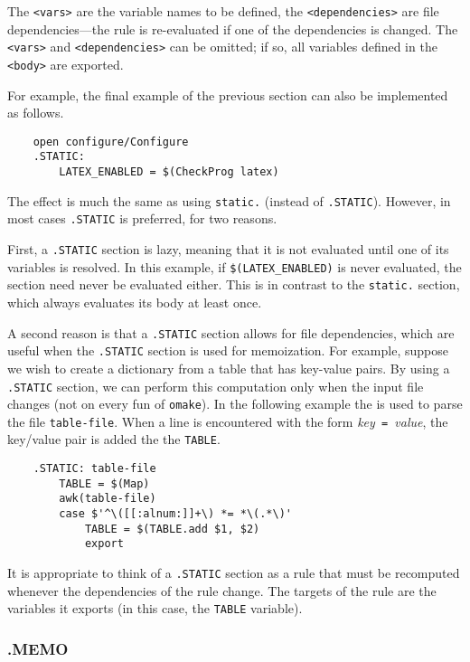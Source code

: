 The \verb+<vars>+ are the variable names to be defined, the \verb+<dependencies>+ are file
dependencies---the rule is re-evaluated if one of the dependencies is changed.  The \verb+<vars>+
and \verb+<dependencies>+ can be omitted; if so, all variables defined in the \verb+<body>+ are
exported.

For example, the final example of the previous section can also be implemented as follows.

\begin{verbatim}
    open configure/Configure
    .STATIC:
        LATEX_ENABLED = $(CheckProg latex)
\end{verbatim}
%
The effect is much the same as using \verb+static.+ (instead of \verb+.STATIC+).  However, in most
cases \verb+.STATIC+ is preferred, for two reasons.

First, a \verb+.STATIC+ section is lazy, meaning that it is not evaluated until one of its variables
is resolved.  In this example, if \verb+$(LATEX_ENABLED)+ is never evaluated, the section need never
be evaluated either.  This is in contrast to the \verb+static.+ section, which always evaluates its
body at least once.

A second reason is that a \verb+.STATIC+ section allows for file dependencies, which are useful when
the \verb+.STATIC+ section is used for memoization.  For example, suppose we wish to create a
dictionary from a table that has key-value pairs.  By using a \verb+.STATIC+ section, we can perform
this computation only when the input file changes (not on every fun of \verb+omake+).  In the
following example the  is used to parse the file \verb+table-file+.
When a line is encountered with the form \textit{key}\verb+ = +\textit{value}, the key/value pair is
added the the \verb+TABLE+.

\begin{verbatim}
    .STATIC: table-file
        TABLE = $(Map)
        awk(table-file)
        case $'^\([[:alnum:]]+\) *= *\(.*\)'
            TABLE = $(TABLE.add $1, $2)
            export
\end{verbatim}

It is appropriate to think of a \verb+.STATIC+ section as a rule that must be recomputed whenever
the dependencies of the rule change.  The targets of the rule are the variables it exports (in this
case, the \verb+TABLE+ variable).

\subsubsection{.MEMO}
\label{section:.MEMO}

